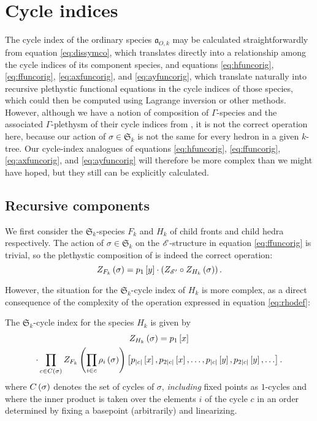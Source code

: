 \documentclass[sectionflow,singlespace,twoside]{brandiss} %
\numberwithin{section}{chapter}
\numberwithin{figure}{chapter}
\begin{document}
\section{Cycle indices}\label{s:ktcycind}
The cycle index of the ordinary species $\mathfrak{a}_{O, k}$ may be calculated straightforwardly from equation \eqref{eq:dissymco}, which translates directly into a relationship among the cycle indices of its component species, and equations \eqref{eq:hfuncorig}, \eqref{eq:ffuncorig}, \eqref{eq:axfuncorig}, and \eqref{eq:ayfuncorig}, which translate naturally into recursive plethystic functional equations in the cycle indices of those species, which could then be computed using Lagrange inversion or other methods.
However, although we have a notion of composition of $\Gamma$-species and the associated $\Gamma$-plethysm of their cycle indices from \cite[\S 3]{hend:specfield}, it is not the correct operation here, because our action of $\sigma \in \mathfrak{S}_{k}$ is not the same for every hedron in a given $k$-tree.
Our cycle-index analogues of equations \eqref{eq:hfuncorig}, \eqref{eq:ffuncorig}, \eqref{eq:axfuncorig}, and \eqref{eq:ayfuncorig} will therefore be more complex than we might have hoped, but they still can be explicitly calculated.

\subsection{Recursive components}\label{ss:ktcycindrec}
We first consider the $\mathfrak{S}_{k}$-species $F_{k}$ and $H_{k}$ of child fronts and child hedra respectively.
The action of $\sigma \in \mathfrak{S}_{k}$ on the $\mathscr{E}$-structure in equation \eqref{eq:ffuncorig} is trivial, so the plethystic composition of \cite[\S 3]{hend:specfield} is indeed the correct operation:
\begin{equation}
  \label{eq:ffunc}
  Z_{F_{k}} \left( {\sigma} \right) = p_{1} \left[ {y} \right] \cdot \left( {Z_{\mathscr{E}'} \circ Z_{H_{k}} \left( {\sigma} \right)} \right).
\end{equation}

However, the situation for the $\mathfrak{S}_{k}$-cycle index of $H_{k}$ is more complex, as a direct consequence of the complexity of the operation expressed in equation \eqref{eq:rhodef}:
\begin{theorem}
  \label{thm:hfunc}
  The $\mathfrak{S}_{k}$-cycle index for the species $H_{k}$ is given by
  \begin{multline}
    \label{eq:hfunc}
    Z_{H_{k}} \left( {\sigma} \right) = p_{1} \left[ {x} \right] \\
    \cdot \prod_{c \in C \left( {\sigma} \right)} Z_{F_{k}} \left( {\prod_{i \in c} \rho_{i} \left( {\sigma} \right)} \right) \left[ {p_{\left\vert {c} \right\vert} \left[ {x} \right], p_{2 \left\vert {c} \right\vert} \left[ {x} \right], \dots, p_{\left\vert {c} \right\vert} \left[ {y} \right], p_{2 \left\vert {c} \right\vert} \left[ {y} \right], \dots} \right].
  \end{multline}
  where $C \left( {\sigma} \right)$ denotes the set of cycles of $\sigma$, \emph{including} fixed points as $1$-cycles and where the inner product is taken over the elements $i$ of the cycle $c$ in an order determined by fixing a basepoint (arbitrarily) and linearizing.
\end{theorem}
\end{document}
